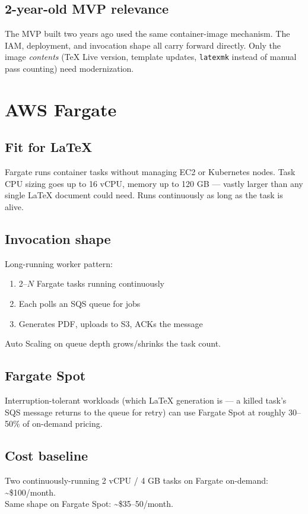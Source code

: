 \documentclass[11pt,letterpaper]{article}
\begin{document}
\subsection{2-year-old MVP relevance}
The MVP built two years ago used the same container-image mechanism. The IAM, deployment, and invocation shape all carry forward directly. Only the image \emph{contents} (TeX Live version, template updates, \texttt{latexmk} instead of manual pass counting) need modernization.

\newpage
\section{AWS Fargate}
\label{app:fargate}

\subsection{Fit for LaTeX}
Fargate runs container tasks without managing EC2 or Kubernetes nodes. Task CPU sizing goes up to 16 vCPU, memory up to 120 GB --- vastly larger than any single LaTeX document could need. Runs continuously as long as the task is alive.

\subsection{Invocation shape}
Long-running worker pattern:
\begin{enumerate}[nosep]
  \item 2--$N$ Fargate tasks running continuously
  \item Each polls an SQS queue for jobs
  \item Generates PDF, uploads to S3, ACKs the message
\end{enumerate}
Auto Scaling on queue depth grows/shrinks the task count.

\subsection{Fargate Spot}
Interruption-tolerant workloads (which LaTeX generation is --- a killed task's SQS message returns to the queue for retry) can use Fargate Spot at roughly 30--50\% of on-demand pricing.

\subsection{Cost baseline}
Two continuously-running 2 vCPU / 4 GB tasks on Fargate on-demand: \textasciitilde \$100/month.\\
Same shape on Fargate Spot: \textasciitilde \$35--50/month.
\end{document}
